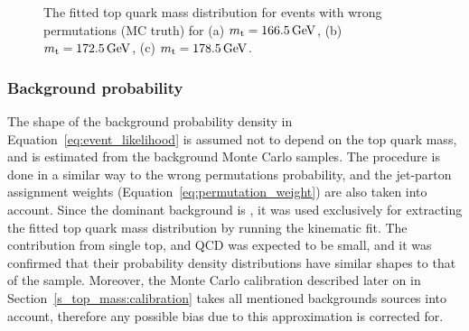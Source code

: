 \begin{figure}[!htpb]
\begin{center}
	\hfill
	\caption{\label{fig:fitted_ttbar_wp_density}
	The fitted top quark mass distribution for \ttbar events with wrong permutations (MC truth) for (a)
	$\mtop=\SI{166.5}{\GeV}$, (b) $\mtop=\SI{172.5}{\GeV}$, (c) $\mtop=\SI{178.5}{\GeV}$.}
\end{center}
\end{figure}

\subsubsection*{Background probability}

The shape of the background probability density in Equation~\ref{eq:event_likelihood} is assumed not to depend on the
top quark mass, and is estimated from the background Monte Carlo samples. The procedure is done in a similar way to the
wrong permutations probability, and the jet-parton assignment weights (Equation~\ref{eq:permutation_weight}) are also
taken into account. Since the dominant background is \WpJets, it was used exclusively for extracting the fitted top
quark mass distribution by running the kinematic fit. The contribution from single top, \ZpJets and QCD was expected to
be small, and it was confirmed that their probability density distributions have similar shapes to that of the \WpJets
sample. Moreover, the Monte Carlo calibration described later on in Section~\ref{s_top_mass:calibration} takes all
mentioned backgrounds sources into account, therefore any possible bias due to this approximation is corrected for.

